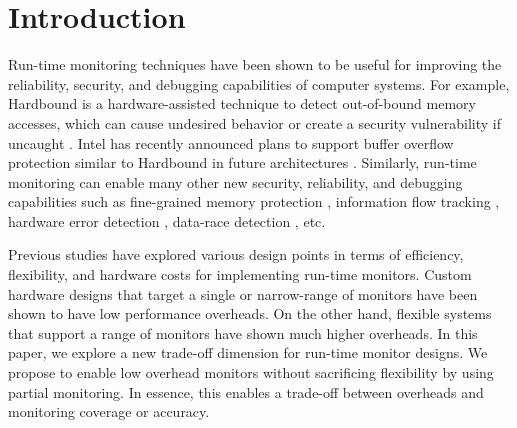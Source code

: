 \section{Introduction}
\label{sec:intro}

Run-time monitoring techniques have been shown to be useful for improving the
reliability, security, and debugging capabilities of computer systems. For
example, Hardbound is a hardware-assisted technique to detect out-of-bound
memory accesses, which can cause undesired behavior or create a security
vulnerability if uncaught \cite{hardbound-asplos08}.  Intel has
recently announced plans to support buffer overflow protection similar to
Hardbound in future architectures \cite{intel-mpx}. Similarly, run-time
monitoring can enable many other new security, reliability, and debugging
capabilities such as fine-grained memory protection \cite{mondrian-asplos02},
information flow tracking \cite{dift-asplos04, testudo-micro08}, hardware error
detection \cite{argus-micro07}, data-race detection \cite{radish-isca12,
cord-hpca06}, etc. 


Previous studies have explored various design points in terms of efficiency,
flexibility, and hardware costs for implementing run-time monitors. Custom
hardware designs that target a single or narrow-range of monitors have been
shown to have low performance overheads. On the other hand, flexible systems
that support a range of monitors have shown much higher overheads. In this
paper, we explore a new trade-off dimension for run-time monitor designs. We
propose to enable low overhead monitors without sacrificing flexibility by
using partial monitoring. In essence, this enables a trade-off between overheads and
monitoring coverage or accuracy.

